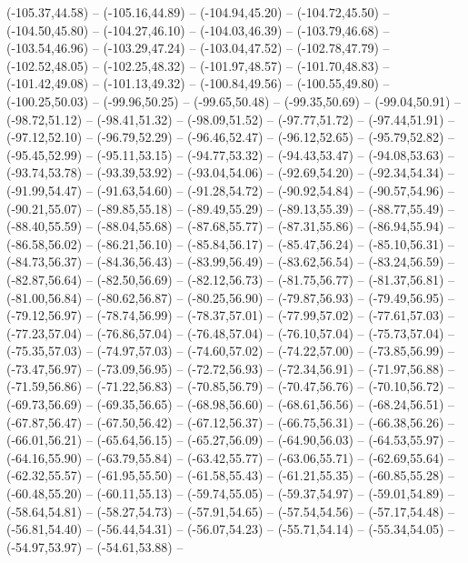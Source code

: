 {  (-105.37,44.58) -- (-105.16,44.89) -- (-104.94,45.20) -- (-104.72,45.50) -- (-104.50,45.80) -- (-104.27,46.10) -- (-104.03,46.39) --
  (-103.79,46.68) -- (-103.54,46.96) -- (-103.29,47.24) -- (-103.04,47.52) -- (-102.78,47.79) -- (-102.52,48.05) -- (-102.25,48.32) --
  (-101.97,48.57) -- (-101.70,48.83) -- (-101.42,49.08) -- (-101.13,49.32) -- (-100.84,49.56) -- (-100.55,49.80) -- (-100.25,50.03) --
  (-99.96,50.25) -- (-99.65,50.48) -- (-99.35,50.69) -- (-99.04,50.91) -- (-98.72,51.12) -- (-98.41,51.32) -- (-98.09,51.52) --
  (-97.77,51.72) -- (-97.44,51.91) -- (-97.12,52.10) -- (-96.79,52.29) -- (-96.46,52.47) -- (-96.12,52.65) -- (-95.79,52.82) --
  (-95.45,52.99) -- (-95.11,53.15) -- (-94.77,53.32) -- (-94.43,53.47) -- (-94.08,53.63) -- (-93.74,53.78) -- (-93.39,53.92) --
  (-93.04,54.06) -- (-92.69,54.20) -- (-92.34,54.34) -- (-91.99,54.47) -- (-91.63,54.60) -- (-91.28,54.72) -- (-90.92,54.84) --
  (-90.57,54.96) -- (-90.21,55.07) -- (-89.85,55.18) -- (-89.49,55.29) -- (-89.13,55.39) -- (-88.77,55.49) -- (-88.40,55.59) --
  (-88.04,55.68) -- (-87.68,55.77) -- (-87.31,55.86) -- (-86.94,55.94) -- (-86.58,56.02) -- (-86.21,56.10) -- (-85.84,56.17) --
  (-85.47,56.24) -- (-85.10,56.31) -- (-84.73,56.37) -- (-84.36,56.43) -- (-83.99,56.49) -- (-83.62,56.54) -- (-83.24,56.59) --
  (-82.87,56.64) -- (-82.50,56.69) -- (-82.12,56.73) -- (-81.75,56.77) -- (-81.37,56.81) -- (-81.00,56.84) -- (-80.62,56.87) --
  (-80.25,56.90) -- (-79.87,56.93) -- (-79.49,56.95) -- (-79.12,56.97) -- (-78.74,56.99) -- (-78.37,57.01) -- (-77.99,57.02) --
  (-77.61,57.03) -- (-77.23,57.04) -- (-76.86,57.04) -- (-76.48,57.04) -- (-76.10,57.04) -- (-75.73,57.04) -- (-75.35,57.03) --
  (-74.97,57.03) -- (-74.60,57.02) -- (-74.22,57.00) -- (-73.85,56.99) -- (-73.47,56.97) -- (-73.09,56.95) -- (-72.72,56.93) --
  (-72.34,56.91) -- (-71.97,56.88) -- (-71.59,56.86) -- (-71.22,56.83) -- (-70.85,56.79) -- (-70.47,56.76) -- (-70.10,56.72) --
  (-69.73,56.69) -- (-69.35,56.65) -- (-68.98,56.60) -- (-68.61,56.56) -- (-68.24,56.51) -- (-67.87,56.47) -- (-67.50,56.42) --
  (-67.12,56.37) -- (-66.75,56.31) -- (-66.38,56.26) -- (-66.01,56.21) -- (-65.64,56.15) -- (-65.27,56.09) -- (-64.90,56.03) --
  (-64.53,55.97) -- (-64.16,55.90) -- (-63.79,55.84) -- (-63.42,55.77) -- (-63.06,55.71) -- (-62.69,55.64) -- (-62.32,55.57) --
  (-61.95,55.50) -- (-61.58,55.43) -- (-61.21,55.35) -- (-60.85,55.28) -- (-60.48,55.20) -- (-60.11,55.13) -- (-59.74,55.05) --
  (-59.37,54.97) -- (-59.01,54.89) -- (-58.64,54.81) -- (-58.27,54.73) -- (-57.91,54.65) -- (-57.54,54.56) -- (-57.17,54.48) --
  (-56.81,54.40) -- (-56.44,54.31) -- (-56.07,54.23) -- (-55.71,54.14) -- (-55.34,54.05) -- (-54.97,53.97) -- (-54.61,53.88) --
}
